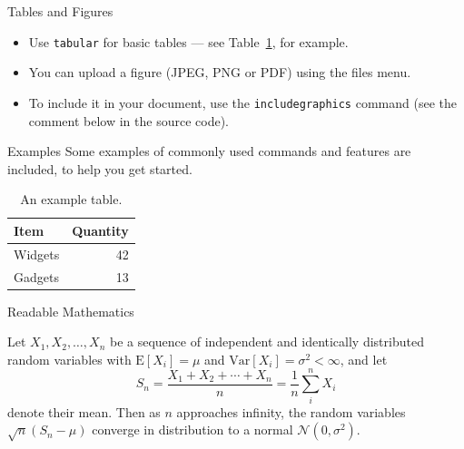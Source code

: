 \documentclass{beamer}
\begin{document}
\begin{frame}{Tables and Figures}

\begin{itemize}
\item Use \texttt{tabular} for basic tables --- see Table~\ref{tab:widgets}, for example.
\item You can upload a figure (JPEG, PNG or PDF) using the files menu.
\item To include it in your document, use the \texttt{includegraphics} command (see the comment below in the source code).
\end{itemize}

\begin{block}{Examples}
	Some examples of commonly used commands and features are included, to help you get started.
\end{block}


\begin{table}
\centering
\begin{tabular}{l|r}
Item & Quantity \\\hline
Widgets & 42 \\
Gadgets & 13
\end{tabular}
\caption{\label{tab:widgets}An example table.}
\end{table}

\end{frame}

\begin{frame}{Readable Mathematics}

Let $X_1, X_2, \ldots, X_n$ be a sequence of independent and identically distributed random variables with $\text{E}[X_i] = \mu$ and $\text{Var}[X_i] = \sigma^2 < \infty$, and let
\[ S_n = \frac{X_1 + X_2 + \cdots + X_n}{n}
      = \frac{1}{n}\sum_{i}^{n} X_i \]
denote their mean. Then as $n$ approaches infinity, the random variables $\sqrt{n}(S_n - \mu)$ converge in distribution to a normal $\mathcal{N}(0, \sigma^2)$.

\end{frame}
\end{document}
